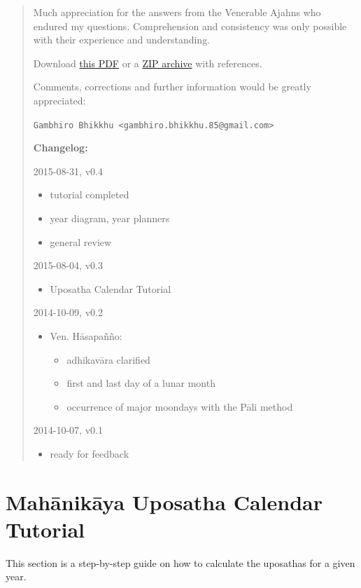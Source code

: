 \documentclass[11pt,oneside]{memoir-article}
\begin{document}
\begin{quote}
Much appreciation for the answers from the Venerable Ajahns who
endured my questions. Comprehension and consistency was only possible
with their experience and understanding.

Download \href{https://github.com/profound-labs/calculating-the-uposatha-moondays/raw/master/calculating-the-uposatha-moondays.pdf}{this PDF} or a \href{https://github.com/profound-labs/calculating-the-uposatha-moondays/archive/master.zip}{ZIP archive} with references.

Comments, corrections and further information would be greatly
appreciated:

\texttt{Gambhiro Bhikkhu <gambhiro.bhikkhu.85@gmail.com>}

\textbf{Changelog:}

2015-08-31, v0.4
\begin{itemize}
\item tutorial completed
\item year diagram, year planners
\item general review
\end{itemize}
2015-08-04, v0.3
\begin{itemize}
\item Uposatha Calendar Tutorial
\end{itemize}
2014-10-09, v0.2
\begin{itemize}
\item Ven. Hāsapañño:
\begin{itemize}
\item adhikavāra clarified
\item first and last day of a lunar month
\item occurrence of major moondays with the Pāli method
\end{itemize}
\end{itemize}
2014-10-07, v0.1
\begin{itemize}
\item ready for feedback
\end{itemize}
\end{quote}

\clearpage

\chapter{Mahānikāya Uposatha Calendar Tutorial}
\label{sec-1}

This section is a step-by-step guide on how to calculate the uposathas for a
given year.
\end{document}
